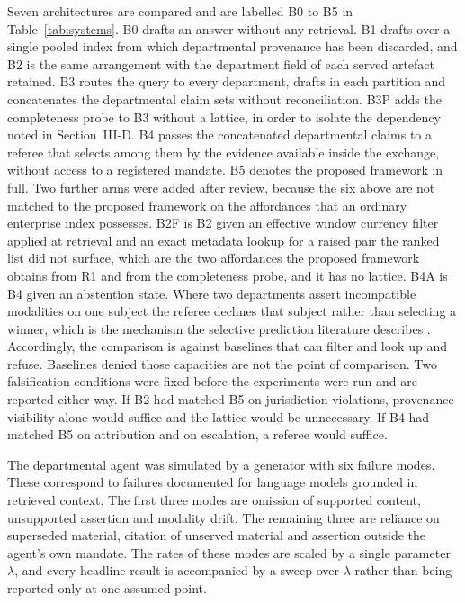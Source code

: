 \documentclass[journal]{IEEEtran}
\begin{document}
Seven architectures are compared and are labelled B0 to B5 in Table~\ref{tab:systems}. B0 drafts an answer without any retrieval. B1 drafts over a single pooled index from which departmental provenance has been discarded, and B2 is the same arrangement with the department field of each served artefact retained. B3 routes the query to every department, drafts in each partition and concatenates the departmental claim sets without reconciliation. B3P adds the completeness probe to B3 without a lattice, in order to isolate the dependency noted in Section~III-D. B4 passes the concatenated departmental claims to a referee that selects among them by the evidence available inside the exchange, without access to a registered mandate. B5 denotes the proposed framework in full. Two further arms were added after review, because the six above are not matched to the proposed framework on the affordances that an ordinary enterprise index possesses. B2F is B2 given an effective window currency filter applied at retrieval and an exact metadata lookup for a raised pair the ranked list did not surface, which are the two affordances the proposed framework obtains from R1 and from the completeness probe, and it has no lattice. B4A is B4 given an abstention state. Where two departments assert incompatible modalities on one subject the referee declines that subject rather than selecting a winner, which is the mechanism the selective prediction literature describes \cite{kamath2020selective}. Accordingly, the comparison is against baselines that can filter and look up and refuse. Baselines denied those capacities are not the point of comparison. Two falsification conditions were fixed before the experiments were run and are reported either way. If B2 had matched B5 on jurisdiction violations, provenance visibility alone would suffice and the lattice would be unnecessary. If B4 had matched B5 on attribution and on escalation, a referee would suffice.

The departmental agent was simulated by a generator with six failure modes. These correspond to failures documented for language models grounded in retrieved context. The first three modes are omission of supported content, unsupported assertion and modality drift. The remaining three are reliance on superseded material, citation of unserved material and assertion outside the agent's own mandate. The rates of these modes are scaled by a single parameter $\lambda$, and every headline result is accompanied by a sweep over $\lambda$ rather than being reported only at one assumed point.
\end{document}
